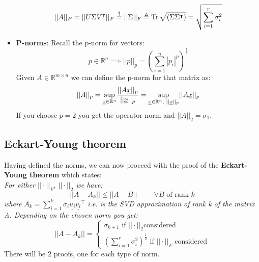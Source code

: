 \begin{itemize}
    \[
        ||A||_F = ||U\Sigma V^\intercal||_F \overset{\dag}{=} ||\Sigma||_F \triangleq  \operatorname{Tr}\sqrt{(\Sigma\Sigma^\intercal)} = \sqrt{\sum\limits_{i=1}^{r}\sigma_i^2}    
    \]
    \item \textbf{P-norms}: Recall the p-norm for vectors:
    \[
        \underline{p} \in \mathbb{R}^n \implies ||\underline{p}||_p = \left(\sum\limits_{i=1}^n |p_i|^p\right)^{\frac{1}{p}}    
    \]
    Given $A \in \mathbb{R}^{m\times n}$ we can define the p-norm for that matrix as:
    \[
        ||A||_p = \underset{\underline{x} \in \mathbb{R}^n}{\sup} \dfrac{||A\underline{x}||_p}{||\underline{x}||_p} = \underset{\underline{x} \in \mathbb{R}^n, \hspace{0.1cm} ||\underline{x}||_p}{\sup} ||A\underline{x}||_p
    \]
    If you choose $p=2$ you get the operator norm and $||A||_2 = \sigma_1$.
\end{itemize}

\subsection{Eckart-Young theorem}
Having defined the norms, we can now proceed with the proof of the \textbf{Eckart-Young theorem} which states:\\

\emph{For either $||\cdot||_F$, $||\cdot||_2$ we have:}
\[
    ||A - A_k|| \leq ||A - B|| \hspace{1cm} \forall B \text{ of rank } k
\]
\emph{where} $A_k = \sum\limits_{i=1}^k \sigma_i\underline{u_i}\underline{v_i}^\intercal$ \emph{i.e. is the SVD approximation of rank k of the matrix A. Depending on the chosen norm you get:}
\[
    ||A - A_k|| = \begin{cases}
        \sigma_{k+1} \text{ if } ||\cdot||_2 \text{considered}\\
        \left(\sum\limits_{i=1}^{r} \sigma_i^2\right)^{\frac{1}{2}} \text{ if } ||\cdot||_F \text{ considered}
    \end{cases}
\]
There will be 2 proofs, one for each type of norm. 

